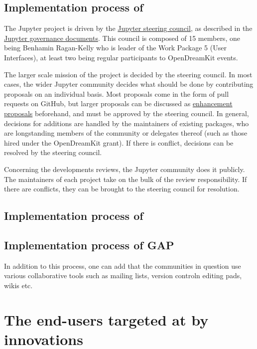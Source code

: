 \documentclass{deliverablereport}
\begin{document}
\subsection{Implementation process of \Jupyter}

The Jupyter project is driven by the \href{https://jupyter.org/about.html}{Jupyter steering council}, as described in the \href{https://github.com/jupyter/governance}{Jupyter governance documents}. This council is composed of 15 members, one being Benhamin Ragan-Kelly who is leader of the Work Package 5 (User Interfaces),  at least two being regular participants to OpenDreamKit events. 

The larger scale mission of the project is decided by the steering council. In most cases, the wider Jupyter community decides what should be done by contributing proposals on an individual basis. Most proposals come in the form of pull requests on GitHub, but larger proposals can be discussed as \href{https://github.com/jupyter/enhancement-proposals}{enhancement proposals} beforehand, and must be approved by the steering council. In general, decisions for additions are handled by the maintainers of existing packages, who are longstanding members of the community or delegates thereof (such as those hired under the OpenDreamKit grant). If there is conflict, decisions can be resolved by the steering council.

Concerning the developments reviews, the Jupyter community does it publicly. The maintainers of each project take on the bulk of the review responsibility. If there are conflicts, they can be brought to the steering council for resolution.


\subsection{Implementation process of \Singular}

\subsection{Implementation process of GAP}



In addition to this process, one can add that the communities in question use various collaborative tools such as mailing lists, version controln editing pads, wikis etc.

\section{The end-users targeted at by innovations}
\end{document}
